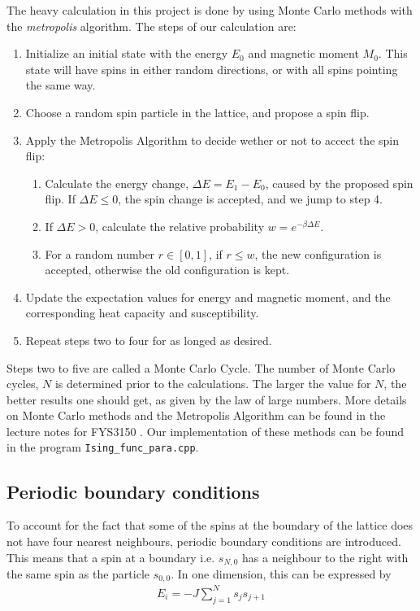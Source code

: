 \documentclass[12pt,english,a4paper]{article}
\begin{document}
The heavy calculation in this project is done by using Monte Carlo methods with the \textit{metropolis} algorithm. The steps of our calculation are:

\begin{enumerate}
    \item Initialize an initial state with the energy $E_0$ and magnetic moment $M_0$. This state will have spins in either random directions, or with all spins pointing the same way.
    \item Choose a random spin particle in the lattice, and propose a spin flip. 
    \item Apply the Metropolis Algorithm to decide wether or not to accect the spin flip:
        \begin{enumerate}
            \item Calculate the energy change, $\Delta E=E_1-E_0$, caused by the proposed spin flip. If $\Delta E \le 0$, the spin change is accepted, and we jump to step 4.
            \item If $\Delta E > 0$, calculate the relative probability $w=e^{-\beta \Delta E}$.
            \item For a random number $r \in [0,1]$, if $r \le w$, the new configuration is accepted, otherwise the old configuration is kept.
        \end{enumerate}
    \item Update the expectation values for energy and magnetic moment, and the corresponding heat capacity and susceptibility.
    \item Repeat steps two to four for as longed as desired.
\end{enumerate}

\noindent Steps two to five are called a Monte Carlo Cycle. The number of Monte Carlo cycles, $N$ is determined prior to the calculations. The larger the value for $N$, the better results one should get, as given by the law of large numbers. More details on Monte Carlo methods and the Metropolis Algorithm can be found in the lecture notes for FYS3150 \cite{LectureIsing}. Our implementation of these methods can be found in the program \texttt{Ising\_func\_para.cpp}. 


\subsection{Periodic boundary conditions}
To account for the fact that some of the spins at the boundary of the lattice does not have four nearest neighbours, periodic boundary conditions are introduced. This means that a spin at a boundary i.e. $s_{N,0}$ has a neighbour to the right with the same spin as the particle $s_{0,0}$. In one dimension, this can be expressed by
\begin{align*}
    E_i=-J\sum_{j=1}^{N}s_js_{j+1}
\end{align*}
\end{document}
